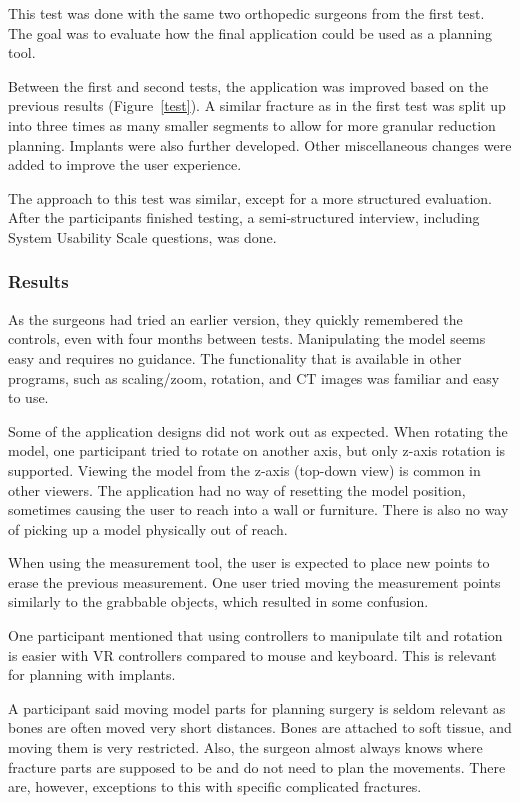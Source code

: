\documentclass[a4paper]{report}
\begin{document}
This test was done with the same two orthopedic surgeons from the first test.
The goal was to evaluate how the final application could be used as a planning tool.

Between the first and second tests, the application was improved based on the previous results (Figure~\ref{test}).
A similar fracture as in the first test was split up into three times as many smaller segments to allow for more granular reduction planning.
Implants were also further developed.
Other miscellaneous changes were added to improve the user experience.

The approach to this test was similar, except for a more structured evaluation. After the participants finished testing, a semi-structured interview, including System Usability Scale questions, was done.


\subsubsection{Results}
As the surgeons had tried an earlier version, they quickly remembered the controls, even with four months between tests. 
Manipulating the model seems easy and requires no guidance. The functionality that is available in other programs, such as scaling/zoom, rotation, and CT images was familiar and easy to use.

Some of the application designs did not work out as expected.
When rotating the model, one participant tried to rotate on another axis, but only z-axis rotation is supported. Viewing the model from the z-axis (top-down view) is common in other viewers.
The application had no way of resetting the model position, sometimes causing the user to reach into a wall or furniture. There is also no way of picking up a model physically out of reach.

When using the measurement tool, the user is expected to place new points to erase the previous measurement. One user tried moving the measurement points similarly to the grabbable objects, which resulted in some confusion.

One participant mentioned that using controllers to manipulate tilt and rotation is easier with VR controllers compared to mouse and keyboard. This is relevant for planning with implants.

A participant said moving model parts for planning surgery is seldom relevant as bones are often moved very short distances. Bones are attached to soft tissue, and moving them is very restricted.
Also, the surgeon almost always knows where fracture parts are supposed to be and do not need to plan the movements. There are, however, exceptions to this with specific complicated fractures.
\end{document}
